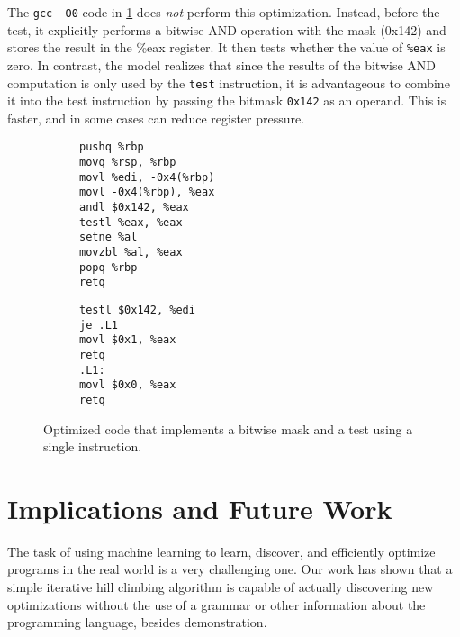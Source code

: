 \documentclass{article}
\begin{document}

The \texttt{gcc -O0} code in \cref{fig:test_and} does \emph{not} perform this optimization.  Instead, before the test, it explicitly performs a bitwise AND operation with the mask (0x142) and stores the result in the \%eax register.  It then tests whether the value of \texttt{\%eax} is zero.  In contrast, the model realizes that since the results of the bitwise AND computation is only used by the \texttt{test} instruction, it is advantageous to combine it into the test instruction by passing the bitmask \texttt{0x142} as an operand.  This is faster, and in some cases can reduce register pressure.

\begin{figure}
    \centering
    \begin{subfigure}[t]{\codeboxwidth}
    \begin{lstlisting}
pushq %rbp
movq %rsp, %rbp
movl %edi, -0x4(%rbp)
movl -0x4(%rbp), %eax
andl $0x142, %eax
testl %eax, %eax
setne %al
movzbl %al, %eax
popq %rbp
retq
    \end{lstlisting}
    \caption{\ozerocodecaption}
    \end{subfigure}
    \hfil
    \begin{subfigure}[t]{\codeboxwidth}
    \begin{lstlisting}
testl $0x142, %edi
je .L1
movl $0x1, %eax
retq
.L1:
movl $0x0, %eax
retq
    \end{lstlisting}
    \caption{\modelcodecaption}
    \end{subfigure}
    \caption{Optimized code that implements a bitwise mask and a test using a single instruction.}
    \label{fig:test_and}
\end{figure}

\section{Implications and Future Work}


The task of using machine learning to learn, discover, and efficiently optimize programs in the real world is a very challenging one. Our work has shown that a simple iterative hill climbing algorithm is capable of actually discovering new optimizations without the use of a grammar or other information about the programming language, besides demonstration. 
\end{document}

